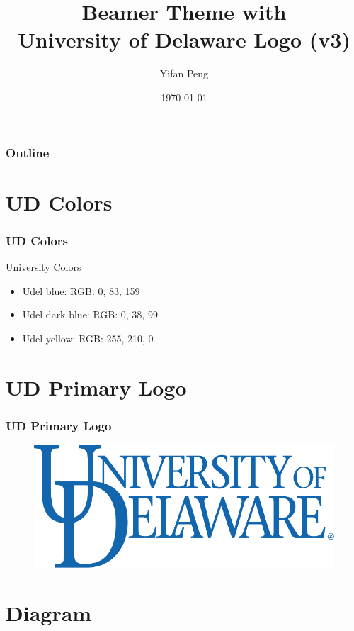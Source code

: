 \documentclass{beamer}
\title{Beamer Theme with \\University of Delaware Logo (v3)}
\author[Yifan Peng]{Yifan Peng}
\institute[Computer \& Information Sciences]{Computer \& Information
Sciences}
\date[today]{\today}
\begin{document}
\begin{frame}[plain]
    \titlepage
\end{frame}

\begin{frame}
\frametitle{Outline} \tableofcontents[hideallsubsections]
\end{frame}

\section{UD Colors}

\begin{frame}
\frametitle{UD Colors}
\begin{exampleblock}{University Colors}
\begin{itemize}
  \item Udel blue: \textcolor{udelblue}{RGB: 0, 83, 159}
  \item Udel dark blue: \textcolor{udeldarkblue}{RGB: 0, 38, 99}
  \item Udel yellow: \textcolor{udelyellow}{RGB: 255, 210, 0}
\end{itemize}
\end{exampleblock}
\end{frame}

\section{UD Primary Logo}

\begin{frame}
\frametitle{UD Primary Logo}
\begin{figure}
	\includegraphics[width=.5\textwidth]{UDPrimaryLogo2945.pdf}
\end{figure}
\end{frame}

\section{Diagram}
\end{document}
